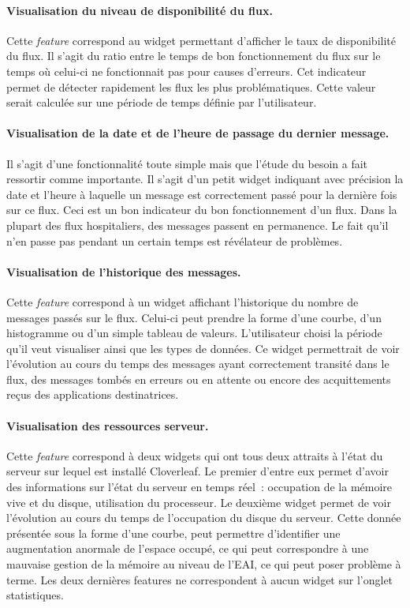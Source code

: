 			\paragraph{Visualisation du niveau de disponibilité du flux.}
			Cette \textit{feature} correspond au widget permettant d'afficher le taux de
			disponibilité du flux. Il s'agit du ratio entre le temps de bon
			fonctionnement du flux sur le temps où celui-ci ne fonctionnait pas pour
			causes d'erreurs. Cet indicateur permet de détecter rapidement les flux les
			plus problématiques. Cette valeur serait calculée sur une période de temps
			définie par l'utilisateur.
			
			\paragraph{Visualisation de la date et de l'heure de passage du dernier
			message.} Il s'agit d'une fonctionnalité toute simple mais que l'étude du besoin a fait
			ressortir comme importante. Il s'agit d'un petit widget indiquant avec
			précision la date et l'heure à laquelle un message est correctement passé
			pour la dernière fois sur ce flux. Ceci est un bon indicateur du bon
			fonctionnement d'un flux. Dans la plupart des flux hospitaliers, des messages
			passent en permanence. Le fait qu'il n'en passe pas pendant un certain temps
			est révélateur de problèmes.
			
			\paragraph{Visualisation de l’historique des messages.}
			Cette \textit{feature} correspond à un widget affichant l'historique du
			nombre de messages passés sur le flux. Celui-ci peut prendre la forme d'une courbe,
			d'un histogramme ou d'un simple tableau de valeurs. L'utilisateur choisi la
			période qu'il veut visualiser ainsi que les types de données. Ce widget
			permettrait de voir l'évolution au cours du temps des messages ayant
			correctement transité dans le flux, des messages tombés en erreurs ou en
			attente ou encore des acquittements reçus des applications destinatrices.
			
			\paragraph{Visualisation des ressources serveur.}
			Cette \textit{feature} correspond à deux widgets qui ont tous deux attraits à
			l'état du serveur sur lequel est installé Cloverleaf. Le premier d'entre eux permet
			d'avoir des informations sur l'état du serveur en temps réel~:
			occupation de la mémoire vive et du disque, utilisation du processeur. Le deuxième widget
			permet de voir l'évolution au cours du temps de l'occupation du disque du
			serveur. Cette donnée présentée sous la forme d'une courbe, peut permettre
			d'identifier une augmentation anormale de l'espace occupé, ce qui peut
			correspondre à une mauvaise gestion de la mémoire au niveau de l'EAI, ce qui
			peut poser problème à terme.\newline
			Les deux dernières features ne correspondent à aucun widget sur l'onglet
			statistiques.
			
